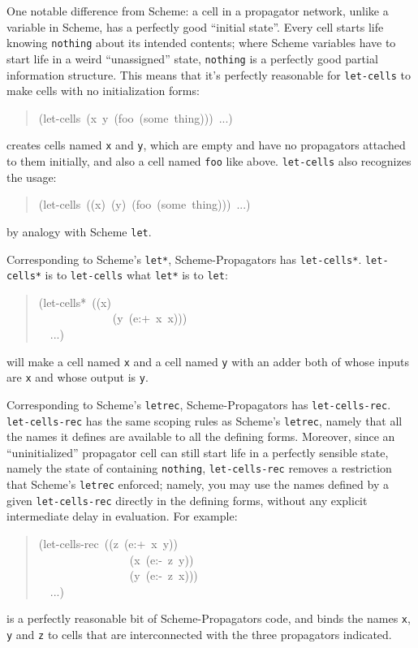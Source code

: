 \documentclass[12pt,letterpaper,english]{article}
\begin{document}
One notable difference from Scheme: a cell in a propagator network,
unlike a variable in Scheme, has a perfectly good ``initial state''.
Every cell starts life knowing \texttt{nothing} about its intended
contents; where Scheme variables have to start life in a weird
``unassigned'' state, \texttt{nothing} is a perfectly good partial
information structure.  This means that it's perfectly reasonable
for \texttt{let-cells} to make cells with no initialization forms:
\begin{quote}{\ttfamily \raggedright \noindent
(let-cells~(x~y~(foo~(some~thing)))~...)
}\end{quote}
creates cells named \texttt{x} and \texttt{y}, which are empty and have
no propagators attached to them initially, and also a cell
named \texttt{foo} like above.  \texttt{let-cells} also recognizes the
usage:
\begin{quote}{\ttfamily \raggedright \noindent
(let-cells~((x)~(y)~(foo~(some~thing)))~...)
}\end{quote}
by analogy with Scheme \texttt{let}.

Corresponding to Scheme's \texttt{let*}, Scheme-Propagators has
\texttt{let-cells*}.  \texttt{let-cells*} is to \texttt{let-cells} what \texttt{let*} is
to \texttt{let}:
\begin{quote}{\ttfamily \raggedright \noindent
(let-cells*~((x)~\\
~~~~~~~~~~~~~(y~(e:+~x~x)))~\\
~~...)
}\end{quote}
will make a cell named \texttt{x} and a cell named \texttt{y} with an adder both
of whose inputs are \texttt{x} and whose output is \texttt{y}.

Corresponding to Scheme's \texttt{letrec}, Scheme-Propagators has
\texttt{let-cells-rec}.  \texttt{let-cells-rec} has the same scoping rules as
Scheme's \texttt{letrec}, namely that all the names it defines are
available to all the defining forms.  Moreover, since an
``uninitialized'' propagator cell can still start life in a perfectly
sensible state, namely the state of containing \texttt{nothing},
\texttt{let-cells-rec} removes a restriction that Scheme's \texttt{letrec}
enforced; namely, you may use the names defined by a given
\texttt{let-cells-rec} directly in the defining forms, without any explicit
intermediate delay in evaluation.  For example:
\begin{quote}{\ttfamily \raggedright \noindent
(let-cells-rec~((z~(e:+~x~y))~\\
~~~~~~~~~~~~~~~~(x~(e:-~z~y))~\\
~~~~~~~~~~~~~~~~(y~(e:-~z~x)))~\\
~~...)
}\end{quote}
is a perfectly reasonable bit of Scheme-Propagators code, and binds
the names \texttt{x}, \texttt{y} and \texttt{z} to cells that are
interconnected with the three propagators indicated.
\end{document}
